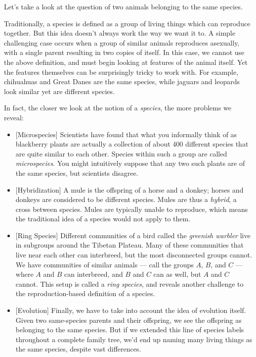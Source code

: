 \documentclass[11pt, oneside]{article}
\theoremstyle{argtstyle}
\begin{document}
Let's take a look at the question of two animals belonging to the
same species.

Traditionally, a species is defined as a group of living things
which can reproduce together. But this idea doesn't always work the way we want
it to. A simple challenging case occurs when a group of similar animals
reproduces asexually, with a single parent resulting in two copies of itself. In
this case, we cannot use the above definition, and must begin looking at
features of the animal itself. Yet the features themselves can be surprisingly
tricky to work with. For example, chihuahuas and Great Danes are the same
species, while jaguars and leopards look similar yet are different species.

In fact, the closer we look at the notion of a {\em species}, the more problems
we reveal:
\begin{itemize}
    \item{} [Microspecies] Scientists have found that what you informally
        think of as blackberry plants are actually a
        collection of about 400
        different species that are quite similar to each other.
        Species within such a group are called {\em microspecies}.
        You might intuitively
        suppose that any two such plants are of the same species,
        but scientists disagree.
    \item{} [Hybridization] A mule is the offspring of a horse and a donkey;
        horses and donkeys are considered to be different species.
        Mules are thus a {\em hybrid}, a cross between species.
        Mules
        are typically unable to reproduce, which means the
        traditional idea of a species would not apply to them.
    \item{} [Ring Species] Different communities of a bird called the
        {\em greenish warbler} live in subgroups around the Tibetan Plateau.
        Many of these communities that live near each other can interbreed, but
        the most disconnected groups cannot. We have
        communities of similar animals --- call the groups $A$, $B$, and $C$ ---
        where $A$ and $B$ can interbreed, and $B$ and $C$ can as well, but $A$
        and $C$ cannot. This setup is called a {\em ring species}, and reveals
        another challenge to the reproduction-based definition of a species.
    \item{} [Evolution] Finally, we have to take into account the idea of
        evolution itself.
        Given two same-species parents and their offspring, we see the
        offspring as belonging to the same species.
        But if we extended this line of
        species labels throughout a complete family tree, we'd end up naming
        many living things as the same species, despite vast differences.


\end{itemize}
\end{document}
